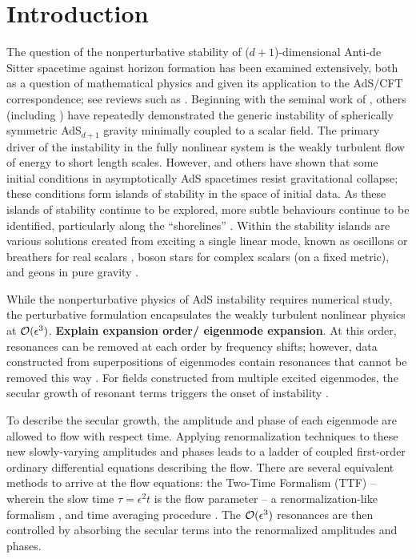 \documentclass[../PhD.tex]{subfiles}
\begin{document}

\section{Introduction}

The question of the nonperturbative stability of ($d+1$)-dimensional Anti-de Sitter spacetime against horizon formation has been examined extensively, both as a question of mathematical physics and given its application to the AdS/CFT correspondence; see reviews such as \cite{1708.05600}. Beginning with the seminal work of \cite{1104.3702}, others (including \cite{1108.4539, 1106.2339, 1110.5823, 1210.0890, 1510.02592}) have repeatedly demonstrated the generic instability of spherically symmetric AdS$_{d+1}$ gravity minimally coupled to a scalar field. The primary driver of the instability in the fully nonlinear system is the weakly turbulent flow of energy to short length scales. However, \cite{1303.3186, 1307.2875, 1403.5434} and others have shown that some initial conditions in asymptotically AdS spacetimes resist gravitational collapse; these conditions form islands of stability in the space of initial data. As these islands of stability continue to be explored, more subtle behaviours continue to be identified, particularly along the ``shorelines'' \cite{1508.02709, 1711.00454,1602.03535, 1803.02830}. Within the stability islands are various solutions created from exciting a single linear mode, known as oscillons or breathers for real scalars \cite{1104.3702,1210.0890,1303.3186,1503.07746}, boson stars for complex scalars (on a fixed metric)\cite{1304.4166,1307.2875}, and geons in pure gravity \cite{1109.1825,1208.5772}.

While the nonperturbative physics of AdS instability requires numerical study, the perturbative formulation encapsulates the weakly turbulent nonlinear physics at $\mathcal O(\epsilon^3)$. {\bf Explain expansion order/ eigenmode expansion}. At this order, resonances can be removed at each order by frequency shifts; however, data constructed from superpositions of eigenmodes contain resonances that cannot be removed this way \cite{1109.1825}. For fields constructed from multiple excited eigenmodes, the secular growth of resonant terms triggers the onset of instability \cite{1109.1825, 1306.0317, 1312.5544, 1506.03519}.

To describe the secular growth, the amplitude and phase of each eigenmode are allowed to flow with respect time. Applying renormalization techniques to these new slowly-varying amplitudes and phases leads to a ladder of coupled first-order ordinary differential equations describing the flow.  There are several equivalent methods to arrive at the flow equations: the Two-Time Formalism (TTF) -- wherein the slow time $\tau = \epsilon^2 t$ is the flow parameter \cite{1403.6471} -- a renormalization-like formalism \cite{1407.6273,1412.3249}, and time averaging procedure \cite{1412.3249,1510.07836}. The $\mathcal O(\epsilon^3)$ resonances are then controlled by absorbing the secular terms into the renormalized amplitudes and phases.
\end{document}
